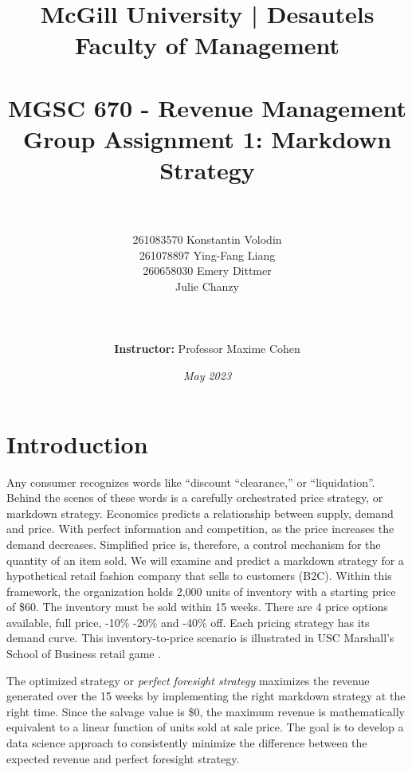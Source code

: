 \documentclass[11pt,a4paper]{article}
\title{
\large{McGill University | Desautels Faculty of Management}\\
\hfill \break
\hfill \break
\hfill \break
\hfill \break
\\\Large MGSC 670 - Revenue Management\\
\textbf{Group Assignment 1: Markdown Strategy}\\
\hfill \break
\hfill \break
}
\author{\\\\
261083570 Konstantin Volodin\\
261078897 Ying-Fang Liang\\
260658030 Emery Dittmer\\
Julie Chanzy\\\\
\hfill \break
\\\\\textbf{Instructor:} Professor Maxime Cohen\\
\hfill \break
}
\date{\emph{May 2023}}
\begin{document}
\maketitle
\thispagestyle{empty}
\pagebreak

\tableofcontents
{}
\pagebreak

\setcounter{page}{1}
\section{Introduction}
Any consumer recognizes words like “discount “clearance,” or “liquidation”. Behind the scenes of these words is a carefully orchestrated price strategy, or markdown strategy. 
Economics predicts a relationship between supply, demand and price. With perfect information and competition, as the price increases the demand decreases. 
Simplified price is, therefore, a control mechanism for the quantity of an item sold. 
We will examine and predict a markdown strategy for a hypothetical retail fashion company that sells to customers (B2C). 
Within this framework, the organization holds 2,000 units of inventory with a starting price of \$60. 
The inventory must be sold within 15 weeks. There are 4 price options available, full price, -10\% -20\% and -40\% off. 
Each pricing strategy has its demand curve. This inventory-to-price scenario is illustrated in USC Marshall’s School of Business retail game \cite{RetailerGame}. 

The optimized strategy or \emph{perfect foresight strategy} maximizes the revenue generated over the 15 weeks by implementing the right markdown strategy at the right time. Since the salvage value is \$0, the maximum revenue is mathematically equivalent to a linear function of units sold at sale price. The goal is to develop a data science approach to consistently minimize the difference between the expected revenue and perfect foresight strategy.  
\end{document}
